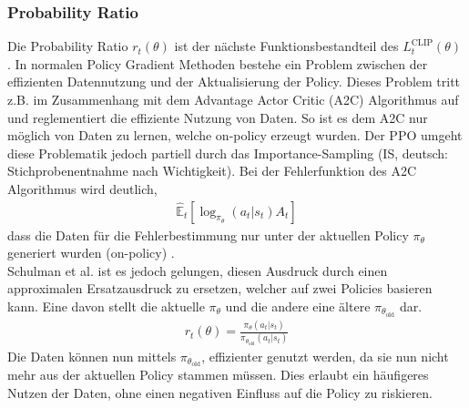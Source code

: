 \subsubsection{Probability Ratio} \label{subsubsec:Grundlagen_Probability_Ratio}
Die Probability Ratio $r_{t}(\theta)$ ist der nächste Funktionsbestandteil des $L^\text{CLIP}_{t} (\theta)$ .
In normalen Policy Gradient Methoden bestehe ein Problem zwischen der effizienten Datennutzung und der Aktualisierung der Policy. Dieses Problem tritt z.B. im Zusammenhang mit dem Advantage Actor Critic (A2C) Algorithmus auf und reglementiert die effiziente Nutzung von Daten. 
So ist es dem A2C nur möglich von Daten zu lernen, welche on-policy  erzeugt wurden.
Der PPO umgeht diese Problematik jedoch partiell durch das Importance-Sampling (IS, deutsch: Stichprobenentnahme nach Wichtigkeit).
Bei der Fehlerfunktion des A2C Algorithmus  wird deutlich,
\begin{align}
	\label{eq:Grundlagen_A2C_Loss}
	\mathbb{\hat{E}}_t[\log_{\pi_{\theta}}(a_t|s_t)A_t]
\end{align}
dass die Daten für die Fehlerbestimmung nur unter der aktuellen Policy $\pi_{\theta}$ generiert wurden (on-policy) \citep[S. 591]{DRL_Lapan}.\\
Schulman et al. ist es jedoch gelungen, diesen Ausdruck durch einen approximalen Ersatzausdruck zu ersetzen, welcher auf zwei Policies basieren kann. Eine davon stellt die aktuelle $\pi_{\theta}$ und die andere eine ältere $\pi_{\theta_{\text{old}}}$ dar.
\begin{align}
	\label{eq:Grundlagen_Probability_Ratio}
	r_{t}(\theta) = \frac{\pi_{\theta}(a_{t}|s_{t})}{\pi_{\theta_{\text{old}}}(a_{t}|s_{t})}
\end{align}
Die Daten können nun mittels $\pi_{\theta_{\text{old}}}$, effizienter genutzt werden, da sie nun nicht mehr aus der aktuellen Policy stammen müssen. Dies erlaubt ein häufigeres Nutzen der Daten, ohne einen negativen Einfluss auf die Policy zu riskieren. \citep[Zeitpunkt: 9:25]{Deep_RL_Bootcamp}

